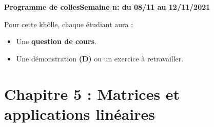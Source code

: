 \documentclass[twoside,a4paper,french,10pt]{VcCours}
\begin{document}

\begin{center}
\large\bf
Programme de collesSemaine n: du 08/11 au 12/11/2021
\end{center}
\separationTitre


Pour cette khôlle, chaque étudiant aura :
\begin{itemize}
\item Une \textbf{question de cours}.
\item Une démonstration \textbf{(D)} ou un exercice à retravailler.
\end{itemize}


\section*{Chapitre 5 : Matrices et applications linéaires}
\end{document}
